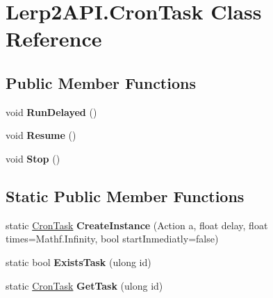 \hypertarget{class_lerp2_a_p_i_1_1_cron_task}{}\section{Lerp2\+A\+P\+I.\+Cron\+Task Class Reference}
\label{class_lerp2_a_p_i_1_1_cron_task}
\subsection*{Public Member Functions}
\begin{DoxyCompactItemize}
\item 
\mbox{\label{class_lerp2_a_p_i_1_1_cron_task_a5d4988057cfff7ce9cfdfab1068dfbbc}} 
void {\bfseries Run\+Delayed} ()
\item 
\mbox{\label{class_lerp2_a_p_i_1_1_cron_task_a48458e0d47de3ae5e503ea0942adb076}} 
void {\bfseries Resume} ()
\item 
\mbox{\label{class_lerp2_a_p_i_1_1_cron_task_a4e894b06fb0e33fc1372d84cbbd24816}} 
void {\bfseries Stop} ()
\end{DoxyCompactItemize}
\subsection*{Static Public Member Functions}
\begin{DoxyCompactItemize}
\item 
\mbox{\label{class_lerp2_a_p_i_1_1_cron_task_afdac73f7e3ba9edf60723ede8e28cf29}} 
static \hyperlink{class_lerp2_a_p_i_1_1_cron_task}{Cron\+Task} {\bfseries Create\+Instance} (Action a, float delay, float times=Mathf.\+Infinity, bool start\+Inmediatly=false)
\item 
\mbox{\label{class_lerp2_a_p_i_1_1_cron_task_a7556cf18640f5081717840d8e8f4d35f}} 
static bool {\bfseries Exists\+Task} (ulong id)
\item 
\mbox{\label{class_lerp2_a_p_i_1_1_cron_task_ab9498ba4ec1aed3465f2b67a53ca5d58}} 
static \hyperlink{class_lerp2_a_p_i_1_1_cron_task}{Cron\+Task} {\bfseries Get\+Task} (ulong id)
\end{DoxyCompactItemize}
